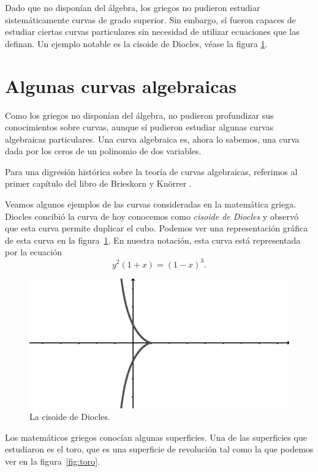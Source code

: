 Dado que no disponían del álgebra, los griegos no
pudieron estudiar sistemáticamente curvas de grado superior. Sin embargo, sí
fueron capaces de estudiar ciertas curvas particulares sin necesidad de
utilizar ecuaciones que las definan. Un ejemplo notable es la cisoide de
Diocles, véase la figura \ref{fig:cisoide}.

\section*{Algunas curvas algebraicas}

Como los griegos no disponían del álgebra, no pudieron profundizar sus
conocimientos sobre curvas, aunque sí pudieron estudiar algunas curvas
algebraicas particulares. Una curva algebraica es, ahora lo sabemos, 
una curva dada por los ceros
de un polinomio de dos variables.  

Para una digresión histórica sobre la teoría
de curvas algebraicas, referimos al primer capítulo del libro de Brieskorn y
Kn\"{o}rrer \cite{MR2975988}.

Veamos algunos ejemplos de las curvas consideradas en la matemática griega. 
Diocles concibió la curva de hoy conocemos como \emph{cisoide de Diocles} y observó que
esta curva permite duplicar el cubo. Podemos ver una representación gráfica de
esta curva en la figura~\ref{fig:cisoide}. En nuestra notación, esta curva
está representada por la ecuación
\[
	y^2(1+x)=(1-x)^3.
\]

\begin{figure}
   \centering
   \includegraphics[scale=0.3]{images/cisoide}
   \caption{La cisoide de Diocles.}
   \label{fig:cisoide}
\end{figure}

Los matemáticos griegos conocían algunas superficies. Una de las superficies
que estudiaron es el toro, que es una superficie de revolución tal como la que
podemos ver en la figura~\ref{fig:toro}. 

